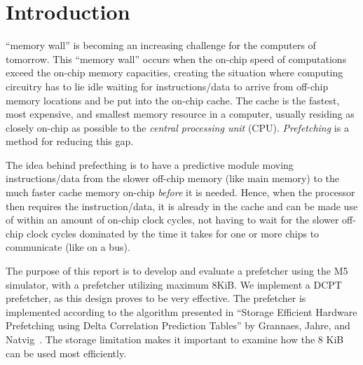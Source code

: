 \section{Introduction}

 ``memory wall'' is becoming an increasing challenge for the
computers of tomorrow. This ``memory wall'' occurs when the on-chip speed of
computations exceed the on-chip memory capacities, creating the situation where
computing circuitry has to lie idle waiting for instructions/data to arrive from
off-chip memory locations and be put into the on-chip cache. The cache is the
fastest, most expensive, and smallest memory resource in a computer, usually
residing as closely on-chip as possible to the \emph{central processing unit}
(CPU). \emph{Prefetching} is a method for reducing this gap.

The idea behind prefecthing is to have a predictive module moving
instructions/data from the slower off-chip memory (like main memory) to the much
faster cache memory on-chip \emph{before} it is needed. Hence, when the
processor then requires the instruction/data, it is already in the cache and can
be made use of within an amount of on-chip clock cycles, not having to wait for
the slower off-chip clock cycles dominated by the time it takes for one or more
chips to communicate (like on a bus).

The purpose of this report is to develop and evaluate a prefetcher using the M5
simulator, with a prefetcher utilizing maximum 8KiB. We implement a DCPT
prefetcher, as this design proves to be very effective. The prefetcher is
implemented according to the algorithm presented in ``Storage Efficient Hardware
Prefetching using Delta Correlation Prediction Tables'' by Grannaes, Jahre, and
Natvig~\cite{dcpt}. The storage limitation makes it important to examine how the
8 KiB can be used most efficiently.


